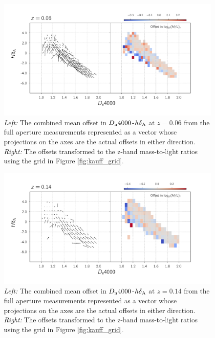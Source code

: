 \begin{figure}
\includegraphics[width=\textwidth]{figures/mlz_offset_b.pdf}
\caption[  \emph{Left:} The combined mean offset in $D_{\rm n}4000$-$h\delta_{\rm A}$ at $z=0.02$ from the full aperture measurements represented as a vector whose projections on the axes are the actual offsets in either direction. \emph{Right:} The offsets transformed to the z-band mass-to-light ratios using the grid in Figure \ref{fig:kauff_grid}. ]{ \emph{Left:} The combined mean offset in $D_{\rm n}4000$-$h\delta_{\rm A}$ at $z=0.06$ from the full aperture measurements represented as a vector whose projections on the axes are the actual offsets in either direction. \emph{Right:} The offsets transformed to the z-band mass-to-light ratios using the grid in Figure \ref{fig:kauff_grid}.
\label{fig:offset_quiver2}}
\end{figure}

\begin{figure}
\includegraphics[width=\textwidth]{figures/mlz_offset_c.pdf}
\caption[ \emph{Left:} The combined mean offset in $D_{\rm n}4000$-$h\delta_{\rm A}$ at $z=0.14$ from the full aperture measurements represented as a vector whose projections on the axes are the actual offsets in either direction. \emph{Right:} The offsets transformed to the z-band mass-to-light ratios using the grid in Figure \ref{fig:kauff_grid}. ]{ \emph{Left:} The combined mean offset in $D_{\rm n}4000$-$h\delta_{\rm A}$ at $z=0.14$ from the full aperture measurements represented as a vector whose projections on the axes are the actual offsets in either direction. \emph{Right:} The offsets transformed to the z-band mass-to-light ratios using the grid in Figure \ref{fig:kauff_grid}.
\label{fig:offset_quiver3}}
\end{figure}

